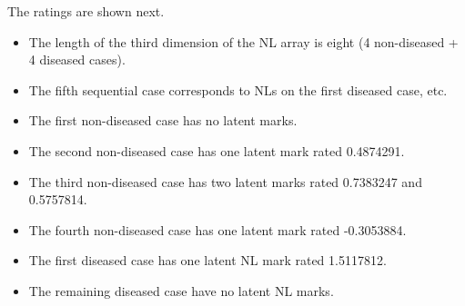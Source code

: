 \documentclass[
]{book}
\newenvironment{Shaded}{\begin{snugshade}}{\end{snugshade}}
\newcommand{\CommentTok}[1]{\textcolor[rgb]{0.56,0.35,0.01}{\textit{#1}}}
\newcommand{\DecValTok}[1]{\textcolor[rgb]{0.00,0.00,0.81}{#1}}
\newcommand{\KeywordTok}[1]{\textcolor[rgb]{0.13,0.29,0.53}{\textbf{#1}}}
\newcommand{\NormalTok}[1]{#1}
\newcommand{\OperatorTok}[1]{\textcolor[rgb]{0.81,0.36,0.00}{\textbf{#1}}}
\newcommand{\StringTok}[1]{\textcolor[rgb]{0.31,0.60,0.02}{#1}}
\providecommand{\tightlist}{%
  \setlength{\itemsep}{0pt}\setlength{\parskip}{0pt}}
\begin{document}
The ratings are shown next.

\begin{Shaded}
\end{Shaded}

\begin{itemize}
\tightlist
\item
  The length of the third dimension of the NL array is eight (4 non-diseased + 4 diseased cases).
\item
  The fifth sequential case corresponds to NLs on the first diseased case, etc.
\item
  The first non-diseased case has no latent marks.
\item
  The second non-diseased case has one latent mark rated 0.4874291.
\item
  The third non-diseased case has two latent marks rated 0.7383247 and 0.5757814.
\item
  The fourth non-diseased case has one latent mark rated -0.3053884.
\item
  The first diseased case has one latent NL mark rated 1.5117812.
\item
  The remaining diseased case have no latent NL marks.
\end{itemize}
\end{document}

